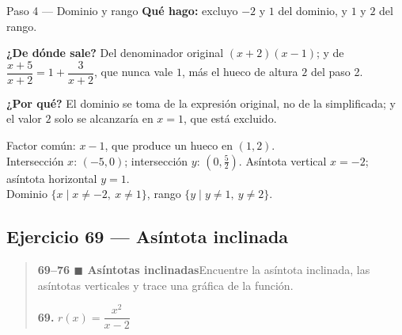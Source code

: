 \documentclass[11pt]{article}
\begin{document}
\begin{paso}{Paso 4 --- Dominio y rango}
\textbf{Qué hago:} excluyo $-2$ y $1$ del dominio, y $1$ y $2$ del rango.

\textbf{¿De dónde sale?} Del denominador original $(x+2)(x-1)$; y de $\dfrac{x+5}{x+2}=1+\dfrac{3}{x+2}$, que nunca vale $1$, más el hueco de altura $2$ del paso 2.

\textbf{¿Por qué?} El dominio se toma de la expresión original, no de la simplificada; y el valor $2$ solo se alcanzaría en $x=1$, que está excluido.
\end{paso}

\begin{center}
\end{center}

\begin{resp}
Factor común: $x-1$, que produce un hueco en $(1,2)$.\\
Intersección $x$: $(-5,0)$; intersección $y$: $\left(0,\tfrac52\right)$. Asíntota vertical $x=-2$; asíntota horizontal $y=1$.\\
Dominio $\{x\mid x\ne -2,\ x\ne 1\}$, rango $\{y\mid y\ne 1,\ y\ne 2\}$.
\end{resp}

\subsection*{Ejercicio 69 — Asíntota inclinada}

\begin{quote}
\textbf{69--76 $\blacksquare$ Asíntotas inclinadas}\quad Encuentre la asíntota inclinada, las asíntotas verticales y trace una gráfica de la función.

\textbf{69.} $r(x)=\dfrac{x^2}{x-2}$
\end{quote}
\end{document}
